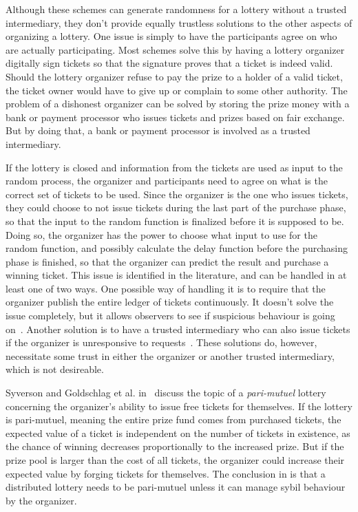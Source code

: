 Although these schemes can generate randomness for a lottery without a trusted intermediary, they don't provide equally trustless solutions to the other aspects of organizing a lottery. One issue is simply to have the participants agree on who are actually participating. Most schemes solve this by having a lottery organizer digitally sign tickets so that the signature proves that a ticket is indeed valid. Should the lottery organizer refuse to pay the prize to a holder of a valid ticket, the ticket owner would have to give up or complain to some other authority. The problem of a dishonest organizer can be solved by storing the prize money with a bank or payment processor who issues tickets and prizes based on fair exchange. But by doing that, a bank or payment processor is involved as a trusted intermediary. 

If the lottery is closed and information from the tickets are used as input to the random process, the organizer and participants need to agree on what is the correct set of tickets to be used. Since the organizer is the one who issues tickets, they could choose to not issue tickets during the last part of the purchase phase, so that the input to the random function is finalized before it is supposed to be. Doing so, the organizer has the power to choose what input to use for the random function, and possibly calculate the delay function before the purchasing phase is finished, so that the organizer can predict the result and purchase a winning ticket. This issue is identified in the literature, and can be handled in at least one of two ways. One possible way of handling it is to require that the organizer publish the entire ledger of tickets continuously. It doesn't solve the issue completely, but it allows observers to see if suspicious behaviour is going on~\cite{syverson_weakly_1998}. Another solution is to have a trusted intermediary who can also issue tickets if the organizer is unresponsive to requests~\cite{zhou_playing_2001}. These solutions do, however, necessitate some trust in either the organizer or another trusted intermediary, which is not desireable.

Syverson and Goldschlag et al. in~\cite{syverson_weakly_1998,goldschlag_temporarily_2010} discuss the topic of a \emph{pari-mutuel} lottery concerning the organizer's ability to issue free tickets for themselves. If the lottery is pari-mutuel, meaning the entire prize fund comes from purchased tickets, the expected value of a ticket is independent on the number of tickets in existence, as the chance of winning decreases proportionally to the increased prize. But if the prize pool is larger than the cost of all tickets, the organizer could increase their expected value by forging tickets for themselves. The conclusion in \cite{syverson_weakly_1998, goldschlag_temporarily_2010} is that a distributed lottery needs to be pari-mutuel unless it can manage sybil behaviour by the organizer.


